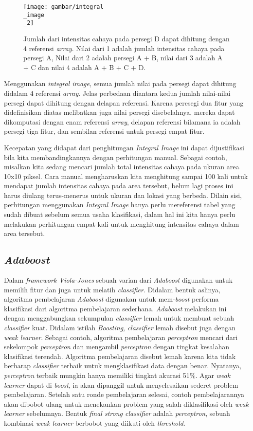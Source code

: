 \begin{figure}[H]
  \centering{}
	\texttt{[image: gambar/integral\\\_image\\\_2]}
  \caption{Jumlah dari intensitas cahaya pada persegi D dapat dihitung dengan 4 referensi \textit{array}. Nilai dari 1 adalah jumlah intensitas cahaya pada persegi A, Nilai dari 2 adalah persegi A + B, nilai dari 3 adalah A + C dan nilai 4 adalah A + B + C + D.}
\end{figure}

Menggunakan \emph{integral image}, semua jumlah nilai pada persegi dapat 
dihitung didalam 4 referensi \emph{array}. Jelas perbedaan 
diantara kedua jumlah nilai-nilai persegi dapat dihitung 
dengan delapan referensi. Karena peresegi dua fitur yang 
didefinisikan diatas melibatkan juga nilai persegi disebelahnya, 
mereka dapat dikomputasi dengan enam referensi \emph{array}, delapan referensi
bilamana ia adalah persegi tiga fitur, dan sembilan referensi untuk 
persegi empat fitur.

Kecepatan yang didapat dari penghitungan \emph{Integral Image} ini dapat dijustifikasi 
bila kita membandingkannya dengan perhitungan manual. Sebagai contoh, misalkan 
kita sedang mencari jumlah total intensitas cahaya pada ukuran area 10x10 
piksel. Cara manual mengharuskan kita menghitung sampai 100 kali untuk mendapat 
jumlah intensitas cahaya pada area tersebut, belum lagi proses ini harus 
diulang terus-menerus untuk ukuran dan lokasi yang berbeda. Dilain sisi, 
perhitungan menggunakan \emph{Integral Image} hanya perlu mereferensi tabel yang 
sudah dibuat sebelum semua usaha klasifikasi, dalam hal ini kita hanya perlu 
melakukan perhitungan empat kali untuk menghitung intensitas cahaya dalam area 
tersebut.

\subsection{\emph{Adaboost}}
Dalam \emph{framework Viola-Jones} sebuah varian dari \emph{Adaboost} 
digunakan untuk memilih fitur dan juga untuk melatih \textit{classifier}. 
Didalam bentuk aslinya, algoritma pembelajaran \emph{Adaboost} digunakan 
untuk mem-\textit{boost} performa klasifikasi dari algoritma pembelajaran 
sederhana. \emph{Adaboost} melakukan ini dengan menggabungkan sekumpulan 
\emph{classifier} lemah untuk membuat sebuah \emph{classifier} kuat. 
Didalam istilah \emph{Boosting}, \emph{classifier} lemah disebut juga 
dengan \emph{weak learner}. Sebagai contoh, algoritma pembelajaran \emph{perceptron} 
mencari dari sekelompok \emph{perceptron} dan mengambil \emph{perceptron} 
dengan tingkat kesalahan klasifikasi terendah. Algoritma pembelajaran disebut 
lemah karena kita tidak berharap \emph{classifier} terbaik untuk mengklasifikasi 
data dengan benar. Nyatanya, \emph{perceptron} terbaik mungkin 
hanya memiliki tingkat akurasi 51\%. Agar \emph{weak learner} dapat di-\textit{boost}, 
ia akan dipanggil untuk menyelesaikan sederet problem pembelajaran. Setelah 
satu ronde pembelajaran selesai, contoh pembelajarannya akan dibobot ulang 
untuk menekankan problem yang salah diklasifikasi oleh \emph{weak learner} 
sebelumnya. Bentuk \emph{final strong classifier} adalah \emph{perceptron}, 
sebuah kombinasi \emph{weak learner} berbobot yang diikuti oleh \emph{threshold}.

